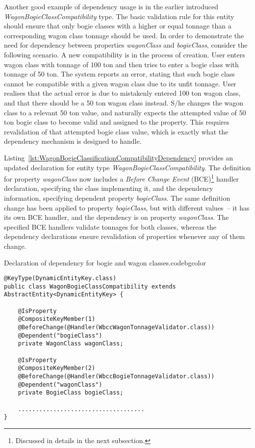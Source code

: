   Another good example of dependency usage is in the earlier introduced \emph{WagonBogieClassCompatibility} type.
  The basic validation rule for this entity should ensure that only bogie classes with a higher or equal tonnage than a corresponding wagon class tonnage should be used.
  In order to demonstrate the need for dependency between properties \emph{wagonClass} and \emph{bogieClass}, consider the following scenario.
  A new compatibility is in the process of creation.
  User enters wagon class with tonnage of 100 ton and then tries to enter a bogie class with tonnage of 50 ton.
  The system reports an error, stating that such bogie class cannot be compatible with a given wagon class due to its unfit tonnage.
  User realises that the actual error is due to mistakenly entered 100 ton wagon class, and that there should be a 50 ton wagon class instead.
  S/he changes the wagon class to a relevant 50 ton value, and naturally expects the attempted value of 50 ton bogie class to become valid and assigned to the property.
  This requires revalidation of that attempted bogie class value, which is exactly what the dependency mechanism is designed to handle.
  
  Listing~\ref{lst:WagonBogieClassificationCompatibilityDependency} provides an updated declaration for entity type \emph{WagonBogieClassCompatibility}.
  The definition for property \emph{wagonClass} now includes a \emph{Before Change Event} (BCE)\footnote{Discussed in details in the next subsection.} handler declaration, specifying the class implementing it, and the dependency information, specifying dependent property \emph{bogieClass}.
  The same definition change has been applied to property \emph{bogieClass}, but with different values~-- it has its own BCE handler, and the dependency is on property \emph{wagonClass}.
  The specified BCE handlers validate tonnages for both classes, whereas the dependency declarations ensure revalidation of properties whenever any of them change.
  
  \begin{code}{Declaration of dependency for bogie and wagon classes.}{\label{lst:WagonBogieClassificationCompatibilityDependency}}{codebgcolor}
    \begin{lstlisting}
@KeyType(DynamicEntityKey.class)
public class WagonBogieClassCompatibility extends AbstractEntity<DynamicEntityKey> {

    @IsProperty
    @CompositeKeyMember(1)
    @BeforeChange(@Handler(WbccWagonTonnageValidator.class))
    @Dependent("bogieClass")
    private WagonClass wagonClass;

    @IsProperty
    @CompositeKeyMember(2)
    @BeforeChange(@Handler(WbccBogieTonnageValidator.class))
    @Dependent("wagonClass")
    private BogieClass bogieClass;

    ....................................
}
    \end{lstlisting}
  \end{code}
  
